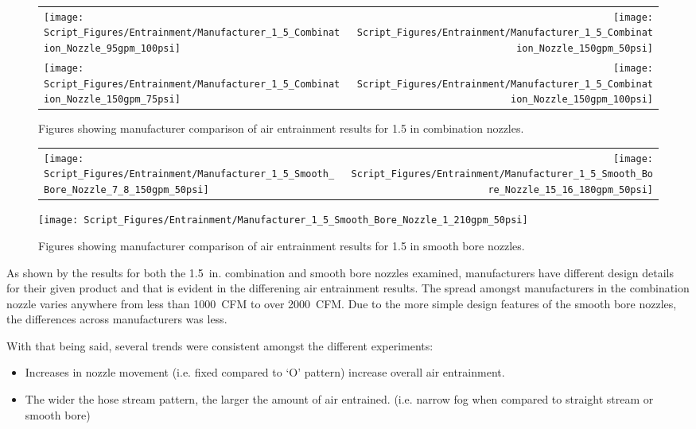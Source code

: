 \documentclass{article}
\begin{document}
\begin{figure}[!ht]
\begin{tabular*}{\textwidth}{lr}
\texttt{[image: Script\_Figures/Entrainment/Manufacturer\_1\_5\_Combination\_Nozzle\_95gpm\_100psi]} &
\texttt{[image: Script\_Figures/Entrainment/Manufacturer\_1\_5\_Combination\_Nozzle\_150gpm\_50psi]} \\
\texttt{[image: Script\_Figures/Entrainment/Manufacturer\_1\_5\_Combination\_Nozzle\_150gpm\_75psi]} &
\texttt{[image: Script\_Figures/Entrainment/Manufacturer\_1\_5\_Combination\_Nozzle\_150gpm\_100psi]} \\
\end{tabular*}
\caption{Figures showing manufacturer comparison of air entrainment results for 1.5 in combination nozzles.}
\label{fig:1_5_Interior_Combination_Manufacturer}
\end{figure}

\clearpage

\begin{figure}[!ht]
\begin{tabular*}{\textwidth}{lr}
\texttt{[image: Script\_Figures/Entrainment/Manufacturer\_1\_5\_Smooth\_Bore\_Nozzle\_7\_8\_150gpm\_50psi]} &
\texttt{[image: Script\_Figures/Entrainment/Manufacturer\_1\_5\_Smooth\_Bore\_Nozzle\_15\_16\_180gpm\_50psi]} \\
\end{tabular*}
\centering
\texttt{[image: Script\_Figures/Entrainment/Manufacturer\_1\_5\_Smooth\_Bore\_Nozzle\_1\_210gpm\_50psi]} 
\caption{Figures showing manufacturer comparison of air entrainment results for 1.5 in smooth bore nozzles.}
\label{fig:1_5_Interior_Smooth_Bore_Manufacturer}
\end{figure}

As shown by the results for both the 1.5~in. combination and smooth bore nozzles examined, manufacturers have different design details for their given product and that is evident in the differening air entrainment results. The spread amongst manufacturers in the combination nozzle varies anywhere from less than 1000~CFM to over 2000~CFM. Due to the more simple design features of the smooth bore nozzles, the differences across manufacturers was less.

With that being said, several trends were consistent amongst the different experiments:

\begin{itemize}
	\item Increases in nozzle movement (i.e. fixed compared to `O' pattern) increase overall air entrainment.
	\item The wider the hose stream pattern, the larger the amount of air entrained. (i.e. narrow fog when compared to straight stream or smooth bore)
\end{itemize}
\end{document}
